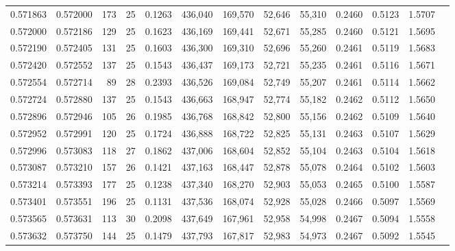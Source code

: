 \begin{tabular}{rrrrrrrrrrrrr}
0.571863 & 0.572000 &   173 &  25 &                                     0.1263 & 436,040 & 169,570 &  52,646 &  55,310 & 0.2460 & 0.5123 & 1.5707 \\
0.572000 & 0.572186 &   129 &  25 &                                     0.1623 & 436,169 & 169,441 &  52,671 &  55,285 & 0.2460 & 0.5121 & 1.5695 \\
0.572190 & 0.572405 &   131 &  25 &                                     0.1603 & 436,300 & 169,310 &  52,696 &  55,260 & 0.2461 & 0.5119 & 1.5683 \\
0.572420 & 0.572552 &   137 &  25 &                                     0.1543 & 436,437 & 169,173 &  52,721 &  55,235 & 0.2461 & 0.5116 & 1.5671 \\
0.572554 & 0.572714 &    89 &  28 &                                     0.2393 & 436,526 & 169,084 &  52,749 &  55,207 & 0.2461 & 0.5114 & 1.5662 \\
0.572724 & 0.572880 &   137 &  25 &                                     0.1543 & 436,663 & 168,947 &  52,774 &  55,182 & 0.2462 & 0.5112 & 1.5650 \\
0.572896 & 0.572946 &   105 &  26 &                                     0.1985 & 436,768 & 168,842 &  52,800 &  55,156 & 0.2462 & 0.5109 & 1.5640 \\
0.572952 & 0.572991 &   120 &  25 &                                     0.1724 & 436,888 & 168,722 &  52,825 &  55,131 & 0.2463 & 0.5107 & 1.5629 \\
0.572996 & 0.573083 &   118 &  27 &                                     0.1862 & 437,006 & 168,604 &  52,852 &  55,104 & 0.2463 & 0.5104 & 1.5618 \\
0.573087 & 0.573210 &   157 &  26 &                                     0.1421 & 437,163 & 168,447 &  52,878 &  55,078 & 0.2464 & 0.5102 & 1.5603 \\
0.573214 & 0.573393 &   177 &  25 &                                     0.1238 & 437,340 & 168,270 &  52,903 &  55,053 & 0.2465 & 0.5100 & 1.5587 \\
0.573401 & 0.573551 &   196 &  25 &                                     0.1131 & 437,536 & 168,074 &  52,928 &  55,028 & 0.2466 & 0.5097 & 1.5569 \\
0.573565 & 0.573631 &   113 &  30 &                                     0.2098 & 437,649 & 167,961 &  52,958 &  54,998 & 0.2467 & 0.5094 & 1.5558 \\
0.573632 & 0.573750 &   144 &  25 &                                     0.1479 & 437,793 & 167,817 &  52,983 &  54,973 & 0.2467 & 0.5092 & 1.5545 \\

\end{tabular}
